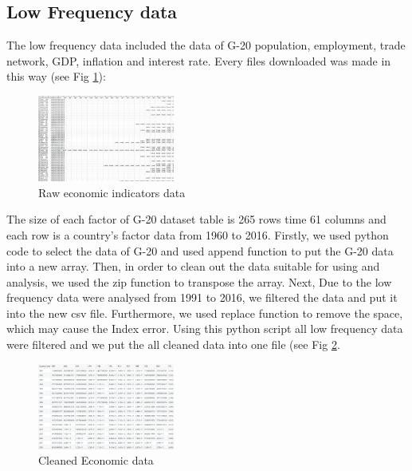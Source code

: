 \subsection{Low Frequency data}
The low frequency data included the data of G-20 population, employment, trade network, GDP, inflation and interest rate. Every files downloaded was made in this way (see Fig \ref{raw_eco_data}): 
\newline

\begin{figure}[!h]
	\begin{center}
		\includegraphics[width=0.40\textwidth]{all_data.png}
		\caption{Raw economic indicators data}
		\label{raw_eco_data}
	\end{center}
\end{figure}


The size of each factor of G-20 dataset table is 265 rows time 61 columns and each row is a country's factor data  from 1960 to 2016.
Firstly, we used python code to select the data of G-20 and used append function to put the G-20 data into a new array.
Then,  in order to clean out the data suitable for using and analysis, we used the zip function to transpose the array.
Next, Due to the low frequency data were analysed from 1991 to 2016, we filtered the data and put it into the new csv file.
Furthermore, we used replace function to remove the space, which may cause the Index error.  Using this python script all low frequency data were filtered and we put the all cleaned data into one file (see Fig \ref{cleaned_eco_data}.
\newline

\begin{figure}[!h]
	\begin{center}
		\includegraphics[width=0.40\textwidth]{Capture.JPG}
		\caption{Cleaned Economic data}
		\label{cleaned_eco_data}
	\end{center}
\end{figure}

